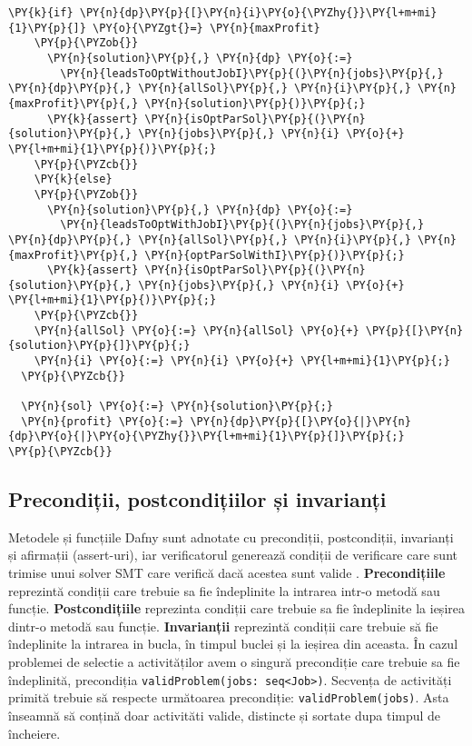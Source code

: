 \begin{Verbatim}[commandchars=\\\{\}, fontsize=\footnotesize]
    \PY{k}{if} \PY{n}{dp}\PY{p}{[}\PY{n}{i}\PY{o}{\PYZhy{}}\PY{l+m+mi}{1}\PY{p}{]} \PY{o}{\PYZgt{}=} \PY{n}{maxProfit}
    \PY{p}{\PYZob{}}
      \PY{n}{solution}\PY{p}{,} \PY{n}{dp} \PY{o}{:=}
        \PY{n}{leadsToOptWithoutJobI}\PY{p}{(}\PY{n}{jobs}\PY{p}{,} \PY{n}{dp}\PY{p}{,} \PY{n}{allSol}\PY{p}{,} \PY{n}{i}\PY{p}{,} \PY{n}{maxProfit}\PY{p}{,} \PY{n}{solution}\PY{p}{)}\PY{p}{;}
      \PY{k}{assert} \PY{n}{isOptParSol}\PY{p}{(}\PY{n}{solution}\PY{p}{,} \PY{n}{jobs}\PY{p}{,} \PY{n}{i} \PY{o}{+} \PY{l+m+mi}{1}\PY{p}{)}\PY{p}{;}
    \PY{p}{\PYZcb{}}
    \PY{k}{else}
    \PY{p}{\PYZob{}}
      \PY{n}{solution}\PY{p}{,} \PY{n}{dp} \PY{o}{:=} 
        \PY{n}{leadsToOptWithJobI}\PY{p}{(}\PY{n}{jobs}\PY{p}{,} \PY{n}{dp}\PY{p}{,} \PY{n}{allSol}\PY{p}{,} \PY{n}{i}\PY{p}{,} \PY{n}{maxProfit}\PY{p}{,} \PY{n}{optParSolWithI}\PY{p}{)}\PY{p}{;}
      \PY{k}{assert} \PY{n}{isOptParSol}\PY{p}{(}\PY{n}{solution}\PY{p}{,} \PY{n}{jobs}\PY{p}{,} \PY{n}{i} \PY{o}{+} \PY{l+m+mi}{1}\PY{p}{)}\PY{p}{;}
    \PY{p}{\PYZcb{}}
    \PY{n}{allSol} \PY{o}{:=} \PY{n}{allSol} \PY{o}{+} \PY{p}{[}\PY{n}{solution}\PY{p}{]}\PY{p}{;} 
    \PY{n}{i} \PY{o}{:=} \PY{n}{i} \PY{o}{+} \PY{l+m+mi}{1}\PY{p}{;}
  \PY{p}{\PYZcb{}}

  \PY{n}{sol} \PY{o}{:=} \PY{n}{solution}\PY{p}{;}
  \PY{n}{profit} \PY{o}{:=} \PY{n}{dp}\PY{p}{[}\PY{o}{|}\PY{n}{dp}\PY{o}{|}\PY{o}{\PYZhy{}}\PY{l+m+mi}{1}\PY{p}{]}\PY{p}{;} 
\PY{p}{\PYZcb{}}
\end{Verbatim}


\subsection{Precondiții, postcondițiilor și invarianți}
Metodele și funcțiile Dafny sunt adnotate cu precondiții, postcondiții, invarianți și afirmații (assert-uri), iar verificatorul generează condiții de verificare care sunt trimise unui solver SMT care verifică
dacă acestea sunt valide \cite{DBLP:journals/jlap/BlazquezMS23}.
\textbf{Precondițiile} reprezintă condiții care trebuie sa fie îndeplinite la intrarea intr-o metodă sau funcție. \textbf{Postcondițiile} reprezinta condiții care trebuie sa fie îndeplinite la ieșirea dintr-o metodă sau funcție.
\textbf{Invarianții} reprezintă condiții care trebuie să fie îndeplinite la intrarea in bucla, în timpul buclei și la ieșirea din aceasta. În cazul problemei de selectie a activităților avem o singură precondiție care trebuie sa fie îndeplinită,  precondiția \texttt{validProblem(jobs: seq<Job>)}. Secvența de activități primită trebuie să respecte următoarea precondiție: 
\texttt{validProblem(jobs)}. Asta înseamnă să conțină doar activităti valide, distincte și sortate dupa timpul de încheiere. 

